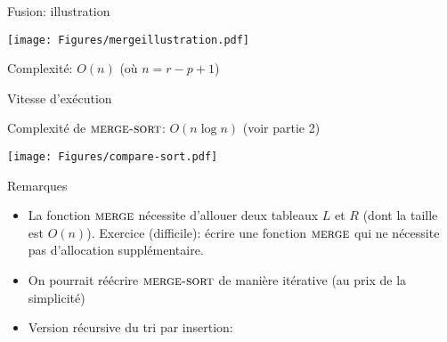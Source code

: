 \begin{frame}{Fusion: illustration}

\centerline{\texttt{[image: Figures/mergeillustration.pdf]}}

\bigskip

Complexité: $O(n)$ (où $n=r-p+1$)

\end{frame}

\begin{frame}{Vitesse d'exécution}

Complexité de $\textnormal{\scshape merge-sort}$: $O(n\log n)$ (voir partie 2)

\bigskip

\centerline{\texttt{[image: Figures/compare-sort.pdf]}}


\end{frame}

\begin{frame}{Remarques}

\begin{itemize}
\item La fonction $\textnormal{\scshape merge}$ nécessite d'allouer deux tableaux $L$
  et $R$ (dont la taille est $O(n)$). Exercice (difficile): écrire une
  fonction $\textnormal{\scshape merge}$ qui ne nécessite pas d'allocation
  supplémentaire.
\item On pourrait réécrire $\textnormal{\scshape merge-sort}$ de manière itérative (au prix de la simplicité)
\item Version récursive du tri par insertion:
\begin{center}
\end{center}
\end{itemize}
\end{frame}

